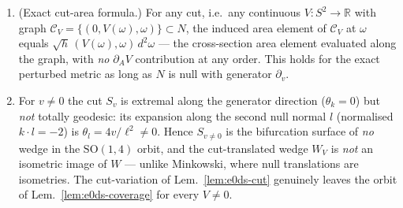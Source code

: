 \begin{lemma}
\begin{enumerate}
vanish identically on $N$, $\theta=\sigma_{AB}=\omega_{AB}\equiv0$;
consequently $R_{vv}|_{N}=0=G_{vv}|_{N}$, and $g_{vv}=4u^{2}/\ell^{2}$
vanishes \emph{quadratically} at $N$.
\item[(iv)] (Exact cut-area formula.) For any cut, i.e.\ any
continuous $V:S^{2}\to\mathbb{R}$ with graph
$\mathcal{C}_{V}=\{(0,V(\omega),\omega)\}\subset N$, the induced area
element of $\mathcal{C}_{V}$ at $\omega$ equals
$\sqrt{h}\,(V(\omega),\omega)\,d^{2}\omega$ --- the cross-section area
element evaluated along the graph, with \emph{no} $\partial_{A}V$
contribution at any order. This holds for the exact perturbed metric
as long as $N$ is null with generator $\partial_{v}$.
\item[(v)] For $v\neq0$ the cut $S_{v}$ is extremal along the
generator direction ($\theta_{k}=0$) but \emph{not} totally geodesic:
its expansion along the second null normal $l$ (normalised
$k\cdot l=-2$) is $\theta_{l}=4v/\ell^{2}\neq0$. Hence $S_{v\neq0}$ is
the bifurcation surface of \emph{no} wedge in the $\mathrm{SO}(1,4)$
orbit, and the cut-translated wedge $W_{V}$ is \emph{not} an isometric
image of $W$ --- unlike Minkowski, where null translations are
isometries. The cut-variation of Lem.~\ref{lem:e0ds-cut} genuinely
leaves the orbit of Lem.~\ref{lem:e0ds-coverage} for every $V\neq0$.
\end{enumerate}
\end{lemma}


